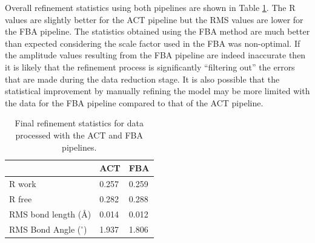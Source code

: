 Overall refinement statistics using both pipelines are shown in Table \ref{tab:Refinement statistics - C.Esp1396I}.
The R values are slightly better for the ACT pipeline but the RMS values are lower for the FBA pipeline.
The statistics obtained using the FBA method are much better than expected considering the scale factor used in the FBA was non-optimal.
If the amplitude values resulting from the FBA pipeline are indeed inaccurate then it is likely that the refinement process is significantly ``filtering out'' the errors that are made during the data reduction stage.
It is also possible that the statistical improvement by manually refining the model may be more limited with the data for the FBA pipeline compared to that of the ACT pipeline.
\begin{table}[ht!]
	\caption[Final refinement statistics for data processed with the ACT and FBA pipelines.]{Final refinement statistics for data processed with the ACT and FBA pipelines.}
	\centering
	\begin{tabular}{p{4cm} | p{2.5cm} | p{2.5cm}}
		   & ACT & FBA  \\
		\hline
		R work                      & 0.257   & 0.259 \\
		R free                      & 0.282   & 0.288 \\
		RMS bond length (\AA)       & 0.014   & 0.012 \\
        RMS Bond Angle ($^{\circ}$) & 1.937   & 1.806 \\
		\hline
	\end{tabular}
	\label{tab:Refinement statistics - C.Esp1396I}
\end{table}
